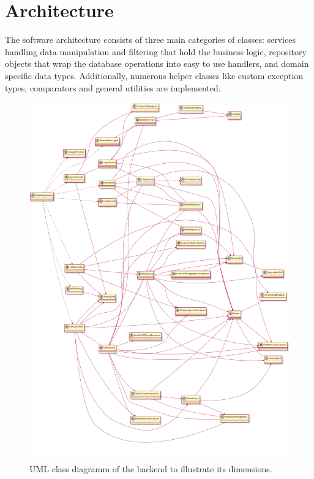 \section{Architecture}
The software architecture consists of three main categories of classes: services handling data manipulation and filtering that hold the business logic, repository objects that wrap the database operations into easy to use handlers, and domain specific data types. Additionally, numerous helper classes like custom exception types, comparators and general utilities are implemented.
\begin{figure}[!h]
    \centering
    \includegraphics[height=0.55\textheight]{images/uml.png}
    \caption[Backend Class Diagramm]{UML class diagramm of the backend to illustrate its dimensions.}
    \label{fig:markovchain}
\end{figure}
\newpage

